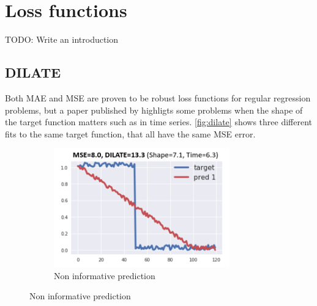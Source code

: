 
\section{Loss functions}
TODO: Write an introduction
\subsection{DILATE}

Both MAE and MSE are proven to be robust loss functions for regular regression problems,
but a paper published by \citeauthor{Guen2019} highligts some problems when the shape of the target function matters
such as in time series.
\autoref{fig:dilate} shows three different fits to the same target function, that all have
the same MSE error.

\begin{figure}[h!]
  \centering
  \begin{subfigure}[b]{0.3\textwidth}
    \centering
    \caption{Non informative prediction}
    \label{fig:dilate-non-informative}
    \includegraphics[width=\textwidth]{./figs/illustrations/dilate_ex1.png}
    \hfill
  \end{subfigure}


\end{figure}
